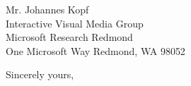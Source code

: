 \documentclass[11pt]{letter} %
\begin{document}
\begin{letter}{Mr. Johannes Kopf\\
Interactive Visual Media Group\\
Microsoft Research Redmond \\
One Microsoft Way
Redmond, WA 98052}

 
\closing{Sincerely yours,}
 
 

\end{letter}
 
\end{document}
